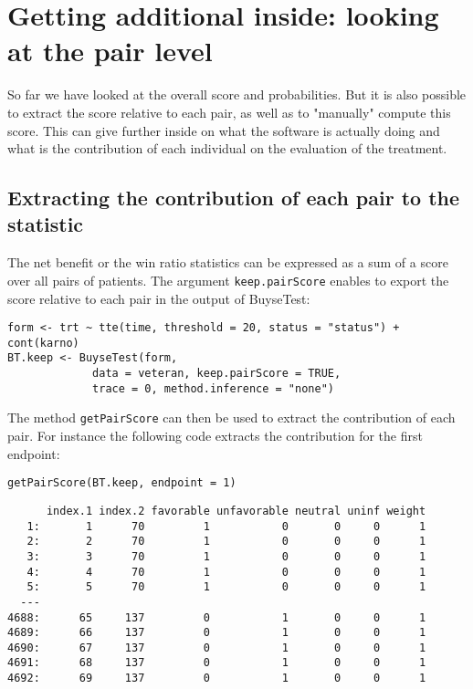 \documentclass[12pt]{article}
\begin{document}
\clearpage

\section{Getting additional inside: looking at the pair level}
\label{sec:orgff57504}

So far we have looked at the overall score and probabilities. But it
is also possible to extract the score relative to each pair, as well
as to "manually" compute this score. This can give further inside on
what the software is actually doing and what is the contribution of
each individual on the evaluation of the treatment.

\subsection{Extracting the contribution of each pair to the statistic}
\label{sec:org23a983d}
The net benefit or the win ratio statistics can be expressed as a sum
of a score over all pairs of patients. The argument \texttt{keep.pairScore}
enables to export the score relative to each pair in the output of
BuyseTest:
\lstset{language=r,label= ,caption= ,captionpos=b,numbers=none}
\begin{lstlisting}
form <- trt ~ tte(time, threshold = 20, status = "status") + cont(karno)
BT.keep <- BuyseTest(form,
		     data = veteran, keep.pairScore = TRUE, 
		     trace = 0, method.inference = "none")
\end{lstlisting}

The method \texttt{getPairScore} can then be used to extract the contribution
of each pair. For instance the following code extracts the
contribution for the first endpoint:
\lstset{language=r,label= ,caption= ,captionpos=b,numbers=none}
\begin{lstlisting}
getPairScore(BT.keep, endpoint = 1)
\end{lstlisting}

\begin{verbatim}
      index.1 index.2 favorable unfavorable neutral uninf weight
   1:       1      70         1           0       0     0      1
   2:       2      70         1           0       0     0      1
   3:       3      70         1           0       0     0      1
   4:       4      70         1           0       0     0      1
   5:       5      70         1           0       0     0      1
  ---                                                           
4688:      65     137         0           1       0     0      1
4689:      66     137         0           1       0     0      1
4690:      67     137         0           1       0     0      1
4691:      68     137         0           1       0     0      1
4692:      69     137         0           1       0     0      1
\end{verbatim}
\end{document}
